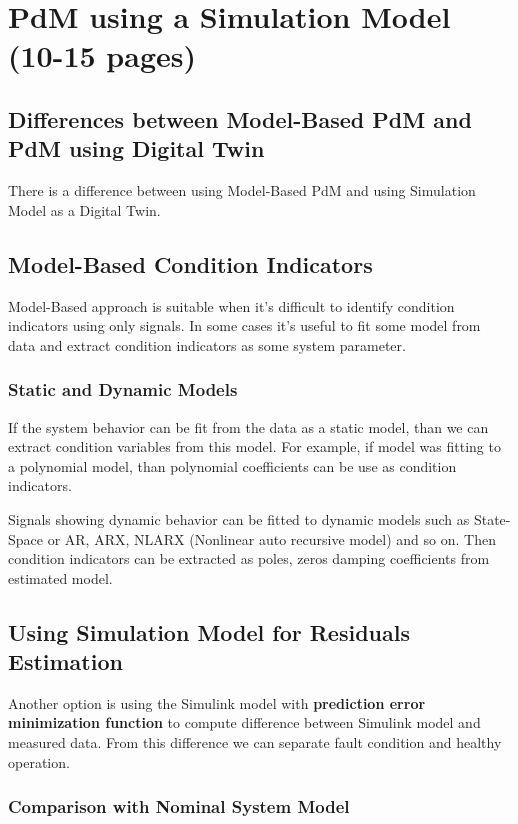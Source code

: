 \documentclass[class=article, crop=false]{standalone}
\begin{document}
\tableofcontents


\section{PdM using a Simulation Model (10-15 pages)}

\subsection{Differences between Model-Based PdM and PdM using Digital Twin}
There is a difference between using Model-Based PdM and using Simulation
Model as a Digital Twin.

\subsection{Model-Based Condition Indicators}
Model-Based approach is suitable when it's difficult to identify condition
indicators using only signals. In some cases it's useful to fit some model
from data and extract condition indicators as some system parameter.

\subsubsection{Static and Dynamic Models}
If the system behavior can be fit from the data as a static model, than we
can extract condition variables from this model. For example, if model
was fitting to a polynomial model, than polynomial coefficients can be use
as condition indicators.

Signals showing dynamic behavior can be fitted to dynamic models such as
State-Space or AR, ARX, NLARX (Nonlinear auto recursive model) and so on.
Then condition indicators can be extracted as poles, zeros damping
coefficients from estimated model.


\subsection{Using Simulation Model for Residuals
Estimation}\label{sec:residuals}
Another option is using the Simulink model with \textbf{prediction
error minimization function} to compute difference between Simulink model
and measured data. From this difference we can separate fault condition and
healthy operation. 


\subsubsection{Comparison with Nominal System Model}
\end{document}
